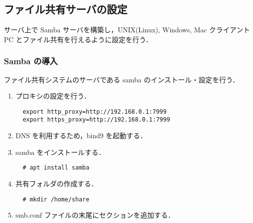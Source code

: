 \documentclass[a4j,titlepage]{jarticle}
\begin{document}
\subsection{ファイル共有サーバの設定}
サーバ上で Samba サーバを構築し，UNIX(Linux), Windows, Mac クライアントPC とファイル共有を行えるように設定を行う．

\subsubsection{Samba の導入}
ファイル共有システムのサーバである samba のインストール・設定を行う．

\begin{enumerate}
\item プロキシの設定を行う．

  \begin{center}
    \begin{screen}
\begin{verbatim}
  export http_proxy=http://192.168.0.1:7999
  export https_proxy=http://192.168.0.1:7999
\end{verbatim}
    \end{screen}
    \end{center}
 
    \item DNS を利用するため，bind9 を起動する．

\item samba をインストールする．

  \begin{center}
    \begin{screen}
\begin{verbatim}
  # apt install samba
\end{verbatim}
    \end{screen}
    \end{center}
  
    \item 共有フォルダの作成する．

  \begin{center}
    \begin{screen}
\begin{verbatim}
  # mkdir /home/share
\end{verbatim}
    \end{screen}
    \end{center}

    \item smb.conf ファイルの末尾にセクションを追加する．


\end{enumerate}
\end{document}
